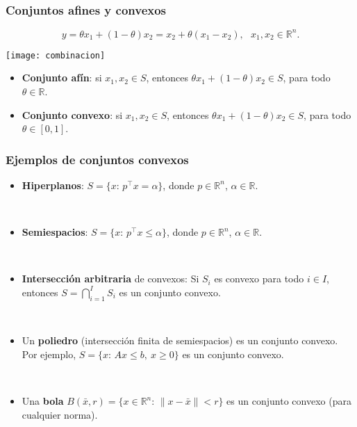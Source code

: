 \documentclass{beamer}
\begin{document}
\begin{frame}
\frametitle{Conjuntos afines y convexos}

\[
y = \theta x_1 + (1-\theta)x_2 = x_2 + \theta (x_1-x_2),\ \ \  x_1,x_2\in\mathbb{R}^n.
\]


\begin{center}
\texttt{[image: combinacion]}
\end{center}

\begin{itemize}
\item 
\textbf{Conjunto afín}: si $x_1,x_2\in S$, entonces $\theta x_1 + (1-\theta)x_2\in S$, para todo $\theta\in \mathbb{R}$.
\item 
\textbf{Conjunto convexo}: si $x_1,x_2\in S$, entonces $\theta x_1 + (1-\theta)x_2\in S$, para todo $\theta\in [0,1]$.
\end{itemize}

\end{frame}
\begin{frame}
\frametitle{Ejemplos de conjuntos convexos}

\begin{itemize}
\item \textbf{Hiperplanos}: $S=\{x:\, p^\top x = \alpha\}$, donde $p\in\mathbb{R}^n$, $\alpha\in\mathbb{R}$. 

\

\item \textbf{Semiespacios}: $S=\{x:\, p^\top x \leq \alpha\}$, donde $p\in\mathbb{R}^n$, $\alpha\in\mathbb{R}$. 

\

\item \textbf{Intersección arbitraria} de convexos: Si $S_i$ es convexo para todo $i\in I$, entonces $S=\bigcap_{i=1}^I S_i$ es un conjunto convexo.

\

\item Un \textbf{poliedro} (intersección finita de semiespacios) es un conjunto convexo. Por ejemplo, $S=\{x:\, Ax\leq b,\ x\geq 0\}$ es un conjunto convexo.


\

\item Una \textbf{bola} $B(\bar x,r)=\{x\in\mathbb{R}^n:\, \|x-\bar x\|<r\}$ es un conjunto convexo (para cualquier norma).


\end{itemize}
\end{frame}
\end{document}
